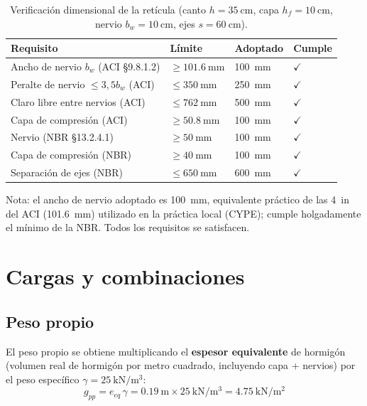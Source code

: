 \begin{table}[H]
\centering
\caption{Verificación dimensional de la retícula (canto $h=\SI{35}{\centi\meter}$,
capa $h_f=\SI{10}{\centi\meter}$, nervio $b_w=\SI{10}{\centi\meter}$, ejes
$s=\SI{60}{\centi\meter}$).}
\label{tab:verif}
\begin{tabular}{lC{3.0cm}C{2.8cm}C{2.0cm}}
\toprule
\textbf{Requisito} & \textbf{Límite} & \textbf{Adoptado} & \textbf{Cumple} \\
\midrule
Ancho de nervio $b_w$ (ACI \S9.8.1.2) & $\geq \SI{101,6}{\milli\meter}$ & \SI{100}{\milli\meter} & $\checkmark$ \\
Peralte de nervio $\leq 3{,}5 b_w$ (ACI) & $\leq \SI{350}{\milli\meter}$ & \SI{250}{\milli\meter} & $\checkmark$ \\
Claro libre entre nervios (ACI) & $\leq \SI{762}{\milli\meter}$ & \SI{500}{\milli\meter} & $\checkmark$ \\
Capa de compresión (ACI) & $\geq \SI{50,8}{\milli\meter}$ & \SI{100}{\milli\meter} & $\checkmark$ \\
Nervio (NBR \S13.2.4.1) & $\geq \SI{50}{\milli\meter}$ & \SI{100}{\milli\meter} & $\checkmark$ \\
Capa de compresión (NBR) & $\geq \SI{40}{\milli\meter}$ & \SI{100}{\milli\meter} & $\checkmark$ \\
Separación de ejes (NBR) & $\leq \SI{650}{\milli\meter}$ & \SI{600}{\milli\meter} & $\checkmark$ \\
\bottomrule
\end{tabular}
\end{table}

Nota: el ancho de nervio adoptado es \SI{100}{\milli\meter}, equivalente
práctico de las \SI{4}{in} del ACI (\SI{101,6}{\milli\meter}) utilizado
en la práctica local (CYPE); cumple holgadamente el mínimo de la NBR.
Todos los requisitos se satisfacen.

\section{Cargas y combinaciones}
\label{sec:cargas}

\subsection{Peso propio}
El peso propio se obtiene multiplicando el \textbf{espesor equivalente}
de hormigón (volumen real de hormigón por metro cuadrado, incluyendo
capa + nervios) por el peso específico
$\gamma = \SI{25}{\kilo\newton\per\cubic\meter}$:
\begin{equation}
  g_{pp} = e_{eq}\,\gamma = \SI{0,19}{\meter} \times
  \SI{25}{\kilo\newton\per\cubic\meter} = \SI{4,75}{\kilo\newton\per\square\meter}
\end{equation}

